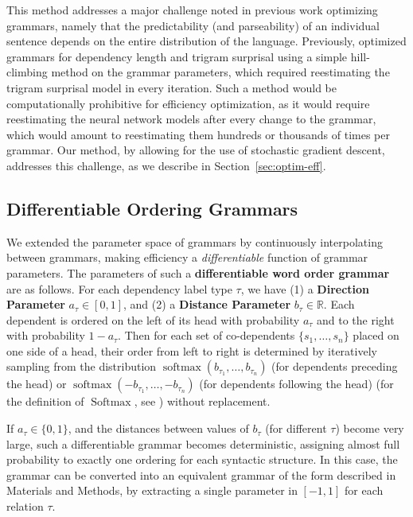 \documentclass[10pt,twoside,lineno]{article}
\newcommand{\key}[1]{\textbf{#1}}
\begin{document}
This method addresses a major challenge noted in previous work optimizing grammars, namely that the predictability (and parseability) of an individual sentence depends on the entire distribution of the language.
Previously, \citet{gildea2015human} optimized grammars for dependency length and trigram surprisal using a simple hill-climbing method on the grammar parameters, which required reestimating the trigram surprisal model in every iteration.
Such a method would be computationally prohibitive for efficiency optimization, as it would require reestimating the neural network models after every change to the grammar, which would amount to reestimating them hundreds or thousands of times per grammar.
Our method, by allowing for the use of stochastic gradient descent, addresses this challenge, as we describe in Section~\ref{sec:optim-eff}.


\subsection{Differentiable Ordering Grammars}\label{sec:diff-gramm}

We extended the parameter space of grammars by continuously interpolating between grammars, making efficiency a \emph{differentiable} function of grammar parameters.
The parameters of such a \key{differentiable word order grammar} are as follows. 
For each dependency label type $\tau$, we have (1) a \key{Direction Parameter} $a_\tau \in [0,1]$, and (2) a \key{Distance Parameter} $b_\tau \in \mathbb{R}$. 
Each dependent is ordered on the left of its head with probability $a_\tau$ and to the right with probability $1-a_\tau$. 
Then for each set of co-dependents $\{s_1, \dots , s_n\}$ placed on one side of a head, their order from left to right is determined by iteratively sampling from the distribution $\operatorname{softmax}(b_{\tau_1}, \dots, b_{\tau_n})$ (for dependents preceding the head) or $\operatorname{softmax}(-b_{\tau_1}, \dots, -b_{\tau_n})$ (for dependents following the head) (for the definition of $\operatorname{Softmax}$, see \cite[p. 184]{goodfellow2016deep}) without replacement.

If $a_\tau \in \{0, 1\}$, and the distances between values of $b_\tau$ (for different $\tau$) become very large, such a differentiable grammar becomes deterministic, assigning almost full probability to exactly one ordering for each syntactic structure.
In this case, the grammar can be converted into an equivalent grammar of the form described in Materials and Methods, by extracting a single parameter in $[-1, 1]$ for each relation $\tau$.
\end{document}
